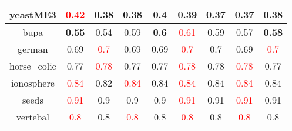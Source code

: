 \documentclass{article}%
\begin{document}
\begin{tabular}{c|cccccccc}
yeastME3&\textcolor{red}{ 
0.42
}&0.38&0.38&\textbf{0.4}&\textbf{0.39}&0.37&0.37&\textbf{0.38}\\%
\hline%
bupa&\textbf{0.55}&0.54&0.59&\textbf{0.6}&\textcolor{red}{ 
0.61
}&0.59&0.57&\textbf{0.58}\\%
\hline%
german&0.69&\textcolor{red}{ 
0.7
}&0.69&0.69&\textcolor{red}{ 
0.7
}&0.7&0.69&\textcolor{red}{ 
0.7
}\\%
\hline%
horse\_colic&0.77&\textcolor{red}{ 
0.78
}&0.77&0.77&\textcolor{red}{ 
0.78
}&0.78&\textcolor{red}{ 
0.78
}&0.77\\%
\hline%
ionosphere&\textcolor{red}{ 
0.84
}&0.82&\textcolor{red}{ 
0.84
}&0.84&\textcolor{red}{ 
0.84
}&0.84&\textcolor{red}{ 
0.84
}&0.84\\%
\hline%
seeds&\textcolor{red}{ 
0.91
}&0.9&0.9&0.9&\textcolor{red}{ 
0.91
}&0.91&\textcolor{red}{ 
0.91
}&0.91\\%
\hline%
vertebal&\textcolor{red}{ 
0.8
}&0.8&\textcolor{red}{ 
0.8
}&0.8&\textcolor{red}{ 
0.8
}&0.8&\textcolor{red}{ 
0.8
}&0.8\\%
\hline%
\end{tabular}

%
\end{document}
